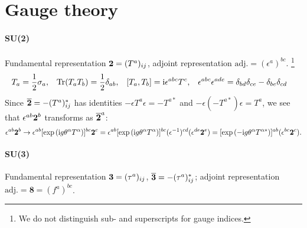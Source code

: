 \documentclass[CheatSheet]{subfiles}
\begin{document}
\summarystyle

\section{Gauge theory}
\paragraph{SU(2)}
Fundamental representation $\boldsymbol 2=(T^a)_{ij}$,
adjoint representation $\text{adj.}=(\epsilon^{a})^{bc}$.%
\footnote{We do not distinguish sub- and superscripts for gauge indices.}
\begin{align*}
 T_a &= \frac{1}{2} \sigma_a,
&
 \operatorname{\mathrm{Tr}}(T_a T_b) &= \frac{1}{2}\delta_{ab},
&
 [T_a, T_b] &= \mathrm{i} \epsilon^{abc}T^c,
&
 \epsilon^{abc}\epsilon^{ade} &= \delta_{bd}\delta_{ce} - \delta_{be}\delta_{cd}
\end{align*}
Since
$\overline{\boldsymbol 2}
  = -(T^a)^*_{ij}$
has identities
 $-\epsilon T^a \epsilon = -T^{a*}$ and
 $-\epsilon (-T^{a*}) \epsilon = T^a$,
%
we see that $\epsilon^{ab}\boldsymbol 2^b$ transforms as $\overline{\boldsymbol 2}^a$:
\begin{equation}
 \epsilon^{ab}\boldsymbol 2^b
\to
 \epsilon^{ab}[\exp\left(\mathrm{i} g \theta^\alpha T^\alpha\right)]^{bc}\boldsymbol 2^{c}
=
 \epsilon^{ab}[\exp\left(\mathrm{i} g \theta^\alpha T^\alpha\right)]^{bc}(\epsilon^{-1})^{cd}(\epsilon^{de}\boldsymbol 2^e)
=
 [\exp\left(-\mathrm{i} g \theta^\alpha T^{\alpha*}\right)]^{ab}(\epsilon^{bc}\boldsymbol 2^c).
\end{equation}

\paragraph{SU(3)}
Fundamental representation $\boldsymbol 3=(\tau^a)_{ij}$,
$\overline{\boldsymbol 3}=-(\tau^{a})^*_{ij}$;
adjoint representation $\text{adj.}=\boldsymbol{8}=(f^{a})^{bc}$.%
\end{document}
